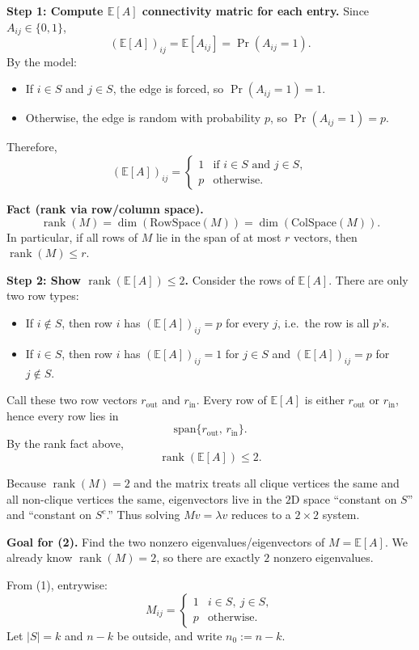 \documentclass[10pt]{article}
\newcommand{\E}{\mathbb{E}}
\DeclareMathOperator{\rank}{rank}
\newcommand{\spara}[1]{\vspace{.5em}\noindent {\large\sffamily\textcolor{nyuOfficialPurple}{#1}}}
\begin{document}
\spara{Pr. 3(1)}

\textbf{Step 1: Compute $\E[A]$ connectivity matric for each entry.}
Since $A_{ij}\in\{0,1\}$,
\[
(\E[A])_{ij}=\E[A_{ij}]=\Pr(A_{ij}=1).
\]
By the model:
\begin{itemize}
\item If $i\in S$ and $j\in S$, the edge is forced, so $\Pr(A_{ij}=1)=1$.
\item Otherwise, the edge is random with probability $p$, so $\Pr(A_{ij}=1)=p$.
\end{itemize}
Therefore,
\[
(\E[A])_{ij}=
\begin{cases}
1 & \text{if } i\in S \text{ and } j\in S,\\
p & \text{otherwise.}
\end{cases}
\]

\medskip
\textbf{Fact (rank via row/column space).}
\[
\boxed{
\rank(M)=\dim(\text{RowSpace}(M))=\dim(\text{ColSpace}(M)).
}
\]
In particular, if all rows of $M$ lie in the span of at most $r$ vectors, then $\rank(M)\le r$.

\medskip
\textbf{Step 2: Show $\rank(\E[A])\le 2$.}
Consider the rows of $\E[A]$. There are only two row types:
\begin{itemize}
\item If $i\notin S$, then row $i$ has $(\E[A])_{ij}=p$ for every $j$, i.e.\ the row is all $p$'s.
\item If $i\in S$, then row $i$ has $(\E[A])_{ij}=1$ for $j\in S$ and $(\E[A])_{ij}=p$ for $j\notin S$.
\end{itemize}
Call these two row vectors $r_{\mathrm{out}}$ and $r_{\mathrm{in}}$. Every row of $\E[A]$ is either $r_{\mathrm{out}}$ or $r_{\mathrm{in}}$, hence every row lies in
\[
\mathrm{span}\{r_{\mathrm{out}},\,r_{\mathrm{in}}\}.
\]
By the rank fact above,
\[
\boxed{\rank(\E[A]) \le 2.}
\]

\spara{Pr. 3(2)}

Because $\rank(M)=2$ and the matrix treats all clique vertices the same and all non-clique vertices the same, eigenvectors live in the $2$D space ``constant on $S$'' and ``constant on $S^c$.'' Thus solving $Mv=\lambda v$ reduces to a $2\times 2$ system.

\medskip
\textbf{Goal for (2).}
Find the two nonzero eigenvalues/eigenvectors of $M=\E[A]$. We already know $\rank(M)=2$, so there are exactly $2$ nonzero eigenvalues.

From (1), entrywise:
\[
M_{ij}=
\begin{cases}
1 & i\in S,\ j\in S,\\
p & \text{otherwise.}
\end{cases}
\]
Let $|S|=k$ and $n-k$ be outside, and write $n_0:=n-k$.
\end{document}
